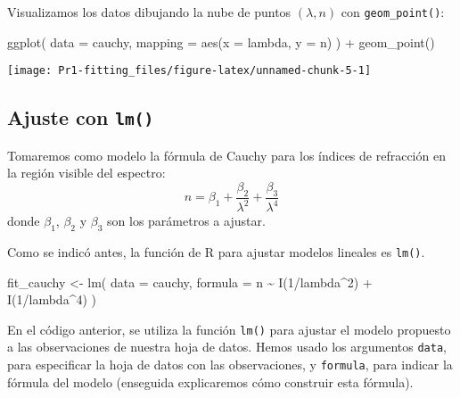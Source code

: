 \documentclass[
  degree=mecinf,
  title=normal,
  toc=normal,
  bib=normal]{mnye}
\newenvironment{Shaded}{\begin{snugshade}}{\end{snugshade}}
\newcommand{\AttributeTok}[1]{\textcolor[rgb]{0.77,0.63,0.00}{#1}}
\newcommand{\DecValTok}[1]{\textcolor[rgb]{0.00,0.00,0.81}{#1}}
\newcommand{\FunctionTok}[1]{\textcolor[rgb]{0.00,0.00,0.00}{#1}}
\newcommand{\NormalTok}[1]{#1}
\newcommand{\OtherTok}[1]{\textcolor[rgb]{0.56,0.35,0.01}{#1}}
\newcommand{\SpecialCharTok}[1]{\textcolor[rgb]{0.00,0.00,0.00}{#1}}
\begin{document}
Visualizamos los datos dibujando la nube de puntos \((\lambda, n)\) con \texttt{geom\_point()}:

\begin{Shaded}
\begin{Highlighting}[]
\FunctionTok{ggplot}\NormalTok{(}
    \AttributeTok{data =}\NormalTok{ cauchy,}
    \AttributeTok{mapping =} \FunctionTok{aes}\NormalTok{(}\AttributeTok{x =}\NormalTok{ lambda, }\AttributeTok{y =}\NormalTok{ n)}
\NormalTok{) }\SpecialCharTok{+} 
    \FunctionTok{geom\_point}\NormalTok{()}
\end{Highlighting}
\end{Shaded}

\begin{center}\texttt{[image: Pr1-fitting\_files/figure-latex/unnamed-chunk-5-1]} \end{center}

\hypertarget{ajuste-con-lm}{%
\subsection{\texorpdfstring{Ajuste con \texttt{lm()}}{Ajuste con lm()}}\label{ajuste-con-lm}}

Tomaremos como modelo la fórmula de Cauchy para los índices de refracción en la región visible del espectro:
\[n = \beta_1 + \frac{\beta_2}{\lambda^2} + \frac{\beta_3}{\lambda^4}\]
donde \(\beta_1\), \(\beta_2\) y \(\beta_3\) son los parámetros a ajustar.

Como se indicó antes, la función de \textsf{R} para ajustar modelos lineales es \texttt{lm()}.

\begin{Shaded}
\begin{Highlighting}[]
\NormalTok{fit\_cauchy }\OtherTok{\textless{}{-}} \FunctionTok{lm}\NormalTok{(}
        \AttributeTok{data =}\NormalTok{ cauchy, }
        \AttributeTok{formula =}\NormalTok{ n }\SpecialCharTok{\textasciitilde{}} \FunctionTok{I}\NormalTok{(}\DecValTok{1}\SpecialCharTok{/}\NormalTok{lambda}\SpecialCharTok{\^{}}\DecValTok{2}\NormalTok{) }\SpecialCharTok{+} \FunctionTok{I}\NormalTok{(}\DecValTok{1}\SpecialCharTok{/}\NormalTok{lambda}\SpecialCharTok{\^{}}\DecValTok{4}\NormalTok{)}
\NormalTok{    )}
\end{Highlighting}
\end{Shaded}

En el código anterior, se utiliza la función \texttt{lm()} para ajustar el modelo propuesto a las observaciones de nuestra hoja de datos.
Hemos usado los argumentos \texttt{data}, para especificar la hoja de datos con las observaciones, y \texttt{formula}, para indicar la fórmula del modelo (enseguida explicaremos cómo construir esta fórmula).
\end{document}
